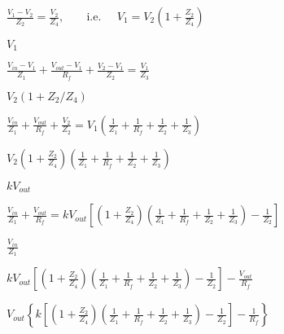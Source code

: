 \documentclass{article}
\def\lthtmlcheckvsize{\ifdim\ht\sizebox<\vsize 
  \ifdim\wd\sizebox<\hsize\expandafter\hfill\fi \expandafter\vfill
  \else\expandafter\vss\fi}%
\begin{document}
{\newpage\clearpage
{}%
$\displaystyle \frac{V_1-V_2}{Z_2}=\frac{V_2}{Z_4},\;\;\;\;\;\;\;\mbox{i.e.}\;\;\;\;\;
    V_1=V_2\left(1+\frac{Z_2}{Z_4}\right)
  $%
\lthtmlindisplaymathZ
\lthtmlcheckvsize\clearpage}

{\newpage\clearpage
{}%
$V_1$%
\lthtmlindisplaymathZ
\lthtmlcheckvsize\clearpage}

{\newpage\clearpage
{}%
$\displaystyle \frac{V_{in}-V_1}{Z_1}+\frac{V_{out}-V_1}{R_f}+\frac{V_2-V_1}{Z_2}
    =\frac{V_1}{Z_3}
  $%
\lthtmlindisplaymathZ
\lthtmlcheckvsize\clearpage}

{\newpage\clearpage
{}%
$V_2(1+Z_2/Z_4)$%
\lthtmlindisplaymathZ
\lthtmlcheckvsize\clearpage}

{\newpage\clearpage
{}%
$\displaystyle \frac{V_{in}}{Z_1}+\frac{V_{out}}{R_f}+\frac{V_2}{Z_2}
=V_1\left(\frac{1}{Z_1}+\frac{1}{R_f}+\frac{1}{Z_2}+\frac{1}{Z_3}\right)$%
\lthtmlindisplaymathZ
\lthtmlcheckvsize\clearpage}

{\newpage\clearpage
{}%
$\displaystyle V_2\left(1+\frac{Z_2}{Z_4}\right)\left(\frac{1}{Z_1}
+\frac{1}{R_f}+\frac{1}{Z_2}+\frac{1}{Z_3}\right)$%
\lthtmlindisplaymathZ
\lthtmlcheckvsize\clearpage}

{\newpage\clearpage
{}%
$kV_{out}$%
\lthtmlindisplaymathZ
\lthtmlcheckvsize\clearpage}

{\newpage\clearpage
{}%
$\displaystyle \frac{V_{in}}{Z_1}+\frac{V_{out}}{R_f}
  =kV_{out}\left[\left(1+\frac{Z_2}{Z_4}\right)\left(\frac{1}{Z_1}+\frac{1}{R_f}
    +\frac{1}{Z_2}+\frac{1}{Z_3}\right)-\frac{1}{Z_2}\right]
  $%
\lthtmlindisplaymathZ
\lthtmlcheckvsize\clearpage}

{\newpage\clearpage
{}%
$\displaystyle \frac{V_{in}}{Z_1}$%
\lthtmlindisplaymathZ
\lthtmlcheckvsize\clearpage}

{\newpage\clearpage
{}%
$\displaystyle kV_{out}\left[\left(1+\frac{Z_2}{Z_4}\right)
\left(\frac{1}{Z_1}
+\frac{1}{R_f}+\frac{1}{Z_2}+\frac{1}{Z_3}\right)-\frac{1}{Z_2}\right]-\frac{V_{out}}{R_f}$%
\lthtmlindisplaymathZ
\lthtmlcheckvsize\clearpage}

{\newpage\clearpage
{}%
$\displaystyle V_{out}\left\{k\left[\left(1+\frac{Z_2}{Z_4}\right)\left(\frac{1}{Z_1}
+\frac{1}{R_f}+\frac{1}{Z_2}+\frac{1}{Z_3}\right)-\frac{1}{Z_2}\right]-\frac{1}{R_f}\right\}$%
\lthtmlindisplaymathZ
\lthtmlcheckvsize\clearpage}
\end{document}
